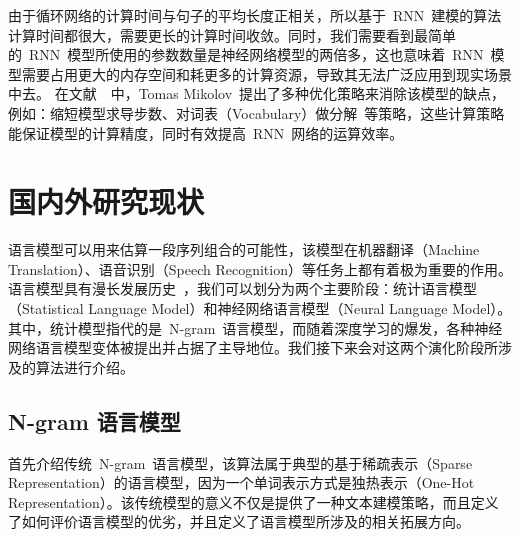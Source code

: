 由于循环网络的计算时间与句子的平均长度正相关，所以基于~RNN~建模的算法计算时间都很大，需要更长的计算时间收敛。同时，我们需要看到最简单的~RNN~模型所使用的参数数量是神经网络模型的两倍多，这也意味着~RNN~模型需要占用更大的内存空间和耗更多的计算资源，导致其无法广泛应用到现实场景中去。
在文献~\cite{DBLP:conf/icassp/MikolovKBCK11}~中，Tomas Mikolov~提出了多种优化策略来消除该模型的缺点，例如：缩短模型求导步数、对词表（Vocabulary）做分解~等策略，这些计算策略能保证模型的计算精度，同时有效提高~RNN~网络的运算效率。

\section{国内外研究现状}
语言模型可以用来估算一段序列组合的可能性，该模型在机器翻译（Machine Translation）、语音识别（Speech Recognition）等任务上都有着极为重要的作用。语言模型具有漫长发展历史~，我们可以划分为两个主要阶段：统计语言模型（Statistical Language Model）和神经网络语言模型（Neural Language Model）。
其中，统计模型指代的是~N-gram~语言模型，而随着深度学习的爆发，各种神经网络语言模型变体被提出并占据了主导地位。我们接下来会对这两个演化阶段所涉及的算法进行介绍。

\subsection{N-gram 语言模型}
首先介绍传统~N-gram~语言模型，该算法属于典型的基于稀疏表示（Sparse Representation）的语言模型，因为一个单词表示方式是独热表示（One-Hot Representation）。该传统模型的意义不仅是提供了一种文本建模策略，而且定义了如何评价语言模型的优劣，并且定义了语言模型所涉及的相关拓展方向。


